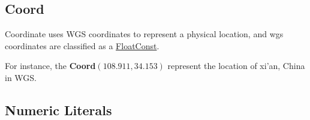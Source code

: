\subsection{Coord} \label{Coord}
Coordinate uses WGS coordinates to represent a physical location, and wgs coordinates are classified as a \hyperref[FloatConst]{FloatConst}.
\begin{grammar}
\end{grammar}
For instance, the \textbf{Coord}$(108.911, 34.153)$ represent the location of  xi'an, China in WGS.

\subsection{Numeric Literals}\label{FloatConst}\label{IntConst}
\begin{grammar}
    \\
    \\
\end{grammar}



